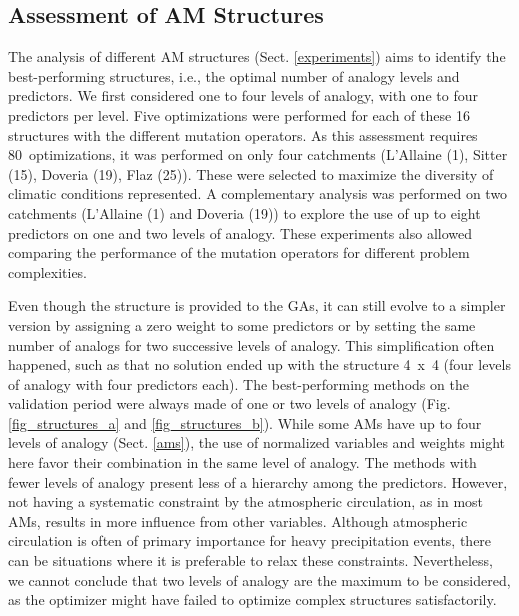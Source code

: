 \documentclass[draft]{agujournal2019}
\begin{document}
\subsection{Assessment of AM Structures}
\label{structures}

The analysis of different AM structures (Sect. \ref{experiments}) aims to identify the best-performing structures, i.e., the optimal number of analogy levels and predictors. We first considered one to four levels of analogy, with one to four predictors per level. Five optimizations were performed for each of these 16 structures with the different mutation operators. As this assessment requires 80~optimizations, it was performed on only four catchments (L'Allaine (1), Sitter (15), Doveria (19), Flaz (25)). These were selected to maximize the diversity of climatic conditions represented. A complementary analysis was performed on two catchments (L'Allaine (1) and Doveria (19)) to explore the use of up to eight predictors on one and two levels of analogy. These experiments also allowed comparing the performance of the mutation operators for different problem complexities.

Even though the structure is provided to the GAs, it can still evolve to a simpler version by assigning a zero weight to some predictors or by setting the same number of analogs for two successive levels of analogy. This simplification often happened, such as that no solution ended up with the structure 4~x~4 (four levels of analogy with four predictors each). The best-performing methods on the validation period were always made of one or two levels of analogy (Fig. \ref{fig_structures_a} and \ref{fig_structures_b}). While some AMs have up to four levels of analogy (Sect. \ref{ams}), the use of normalized variables and weights might here favor their combination in the same level of analogy. The methods with fewer levels of analogy present less of a hierarchy among the predictors. However, not having a systematic constraint by the atmospheric circulation, as in most AMs, results in more influence from other variables. Although atmospheric circulation is often of primary importance for heavy precipitation events, there can be situations where it is preferable to relax these constraints. Nevertheless, we cannot conclude that two levels of analogy are the maximum to be considered, as the optimizer might have failed to optimize complex structures satisfactorily.
\end{document}
